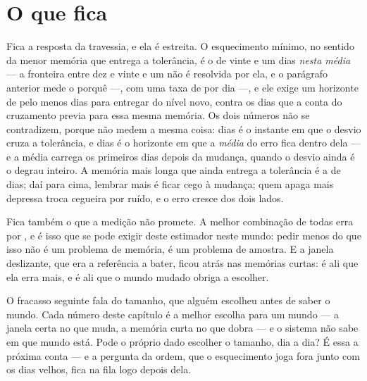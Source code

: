 \section{O que fica}

Fica a resposta da travessia, e ela é estreita. O esquecimento mínimo, no sentido da menor memória que
entrega a tolerância, é o de vinte e um dias \emph{nesta média} --- a fronteira entre dez e vinte e um
não é resolvida por ela, e o parágrafo anterior mede o porquê ---, com uma taxa de
\numEsquecimentoMelhorTaxa{} por
dia ---, e ele exige um horizonte de pelo menos \numEsquecimentoHorizonteCurto{} dias para entregar
\numEsquecimentoTolerancia{} do nível novo, contra os \numEsquecimentoMelhorDias{} dias que a conta
do cruzamento previa para essa mesma memória. Os dois números não se contradizem, porque não medem a
mesma coisa: \numEsquecimentoMelhorDias{} dias é o instante em que o desvio cruza a tolerância, e
\numEsquecimentoHorizonteCurto{} dias é o horizonte em que a \emph{média} do erro fica dentro dela ---
e a média carrega os primeiros dias depois da mudança, quando o desvio ainda é o degrau inteiro. A memória mais longa que ainda entrega a tolerância é a de \numEsquecimentoMemoriaLonga{} dias;
daí para cima, lembrar mais é ficar cego à mudança; quem apaga
mais depressa troca cegueira por ruído, e o erro cresce dos dois lados.

Fica também o que a medição não promete. A melhor combinação de todas erra por
\numEsquecimentoMelhor{}, e é isso que se pode exigir deste estimador neste mundo: pedir menos do que
isso não é um problema de memória, é um problema de amostra. E a janela deslizante, que era a
referência a bater, ficou atrás nas memórias curtas: é ali que ela erra mais, e é ali que o mundo
mudado obriga a escolher.

O fracasso seguinte fala do tamanho, que alguém escolheu antes de saber o mundo. Cada número
deste capítulo é a melhor escolha para um mundo --- a janela certa no que muda, a memória curta no
que dobra --- e o sistema não sabe em que mundo está. Pode o próprio dado escolher o tamanho, dia a
dia? É essa a próxima conta --- e a pergunta da ordem, que o esquecimento joga fora junto com os
dias velhos, fica na fila logo depois dela.
